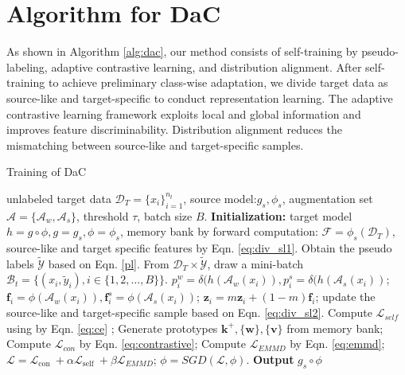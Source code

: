 \documentclass{article}
\def\vf{{\bm{f}}}
\def\vk{{\bm{k}}}
\def\vv{{\bm{v}}}
\def\vw{{\bm{w}}}
\def\vz{{\bm{z}}}
\begin{document}
\section{Algorithm for DaC}\label{supple_Algo}
As shown in Algorithm \ref{alg:dac}, our method consists of self-training by pseudo-labeling, adaptive contrastive learning, and distribution alignment.
After self-training to achieve preliminary class-wise adaptation, we divide target data as source-like and target-specific to conduct representation learning. The adaptive contrastive learning framework exploits local and global information and improves feature discriminability. Distribution alignment reduces the mismatching between source-like and target-specific samples.   




\begin{algorithm}
\caption{Training of DaC}\label{alg:dac}
\begin{algorithmic}
\Require unlabeled target data $\mathcal{D}_T=\{x_i\}_{i=1}^{n_t}$, source model:$g_s, \phi_s$, augmentation set $\mathcal{A}=\{\mathcal{A}_w,\mathcal{A}_s\}$, threshold $\tau$, batch size $B$.
\State \textbf{Initialization:} target model $h = g \circ \phi, g = g_s, \phi =\phi_s$, memory bank by forward computation: $\mathcal{F} = \phi_s(\mathcal{D}_T)$, source-like and target specific features by Eqn. \ref{eq:div_sl1}.
\State Obtain the pseudo labels $\tilde{\mathcal{Y}}$ based on Eqn. \ref{pl}.
\State From $\mathcal{D}_T\times \tilde{\mathcal{Y}}$, draw a mini-batch $\mathcal{B}_t = \{(x_i,\tilde{y}_i),i\in\{1,2,\dots,B\} \}$.
\State $p_i^w = \delta(h(\mathcal{A}_{w}(x_i)), p_i^s = \delta(h(\mathcal{A}_{s}(x_i))$;
\State $\vf_i = \phi(\mathcal{A}_{w}(x_i)), \vf_i^s = \phi(\mathcal{A}_{s}(x_i))$;
\State  $\vz_i = m\vz_i+(1-m)\vf_i$;
\State update the source-like and target-specific sample based on Eqn. \ref{eq:div_sl2}.
\EndFor
\State Compute $\mathcal{L}_{self}$ using by Eqn. \ref{eq:ce} ;
\State Generate prototypes $\vk^+,\{\vw\}, \{\vv\}$ from memory bank;
\State Compute $\mathcal{L}_{con}$ by Eqn. \ref{eq:contrastive}; 
\State Compute $\mathcal{L}_{\textit{EMMD}}$ by Eqn. \ref{eq:emmd}; 
\State $\mathcal{L}=\mathcal{L}_{\text {con }}+\alpha \mathcal{L}_{\text {self }}+\beta \mathcal{L}_{\textit{EMMD}}$;
\State $\phi = SGD(\mathcal{L},\phi)$.
\EndFor
\EndWhile
\State\textbf{Output} $g_s\circ \phi$
\end{algorithmic}
\end{algorithm}
\end{document}
